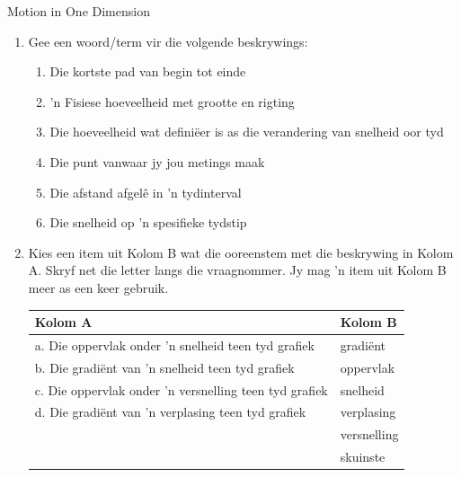\begin{eocexercises}{Motion in One Dimension}
\nopagebreak \noindent
    \begin{enumerate}[noitemsep, label=\textbf{\arabic*}. ] 
    \item Gee een woord/term vir die volgende beskrywings:
    \begin{enumerate}[noitemsep, label=\textbf{\alph*}. ] 
        \item Die kortste pad van begin tot einde
        \item 'n Fisiese hoeveelheid met grootte en rigting
        \item Die hoeveelheid wat defini\"eer is as die verandering van snelheid oor tyd
        \item Die punt vanwaar jy jou metings maak
        \item Die afstand afgel\^e in 'n tydinterval
        \item Die snelheid op 'n spesifieke tydstip
    \end{enumerate}
    \item Kies een item uit Kolom B wat die ooreenstem met die beskrywing in Kolom A. Skryf net die letter langs die vraagnommer. Jy mag 'n item uit Kolom B meer as een keer gebruik.
              \begin{table}[H]
            \begin{center}
          \label{m38796*uid180}
        \noindent
          \begin{tabular}{|l|l|}\hline
            Kolom A &
            Kolom B \\ \hline
            a. Die oppervlak onder 'n snelheid teen tyd grafiek &
            gradi\"ent \\ \hline
            b. Die gradi\"ent van 'n snelheid teen tyd grafiek &
            oppervlak\\ \hline
            c. Die oppervlak onder 'n versnelling teen tyd grafiek &
            snelheid\\ \hline
            d. Die gradi\"ent van 'n verplasing teen tyd grafiek &
            verplasing \\ \hline
             &
            versnelling\\ \hline
             &
            skuinste \\ \hline
        \end{tabular}
          \end{center}
    \end{table}
        \par
    

\end{enumerate}
\end{eocexercises}
